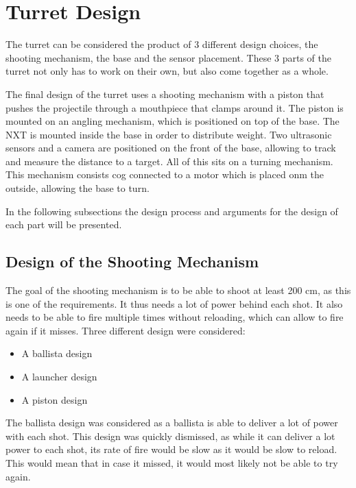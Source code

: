 \section{Turret Design}
The turret can be considered the product of 3 different design choices, the
shooting mechanism, the base and the sensor placement. These 3 parts of the
turret not only has to work on their own, but also come together as a whole.\nl

The final design of the turret uses a shooting mechanism with a piston
that pushes the projectile through a mouthpiece that clamps around it. The
piston is mounted on an angling mechanism, which is positioned on top of
the base. The NXT is mounted inside the base in order to distribute weight. Two
ultrasonic sensors and a camera are positioned on the front of the base,
allowing \name to track and measure the distance to a target. All of this sits
on a turning mechanism. This mechanism consists cog connected to a motor which
is placed onm the outside, allowing the base to turn.

In the following subsections the design process and arguments for the
design of each part will be presented.

\subsection{Design of the Shooting Mechanism}
The goal of the shooting mechanism is to be able to shoot at least
200 cm, as this is one of the requirements. It thus needs a lot of power behind
each shot. It also needs to be able to fire multiple times without reloading,
which can allow to fire again if it misses. Three different design were
considered:

\begin{itemize}
  \item A ballista design
  \item A launcher design
  \item A piston design
\end{itemize}

The ballista design was considered as a ballista is able to deliver a lot of
power with each shot.
This design was quickly dismissed, as while it can deliver a lot power to each
shot, its rate of fire would be slow as it would be slow to reload. This would
mean that in case it missed, it would most likely not be able to try again.\nl


